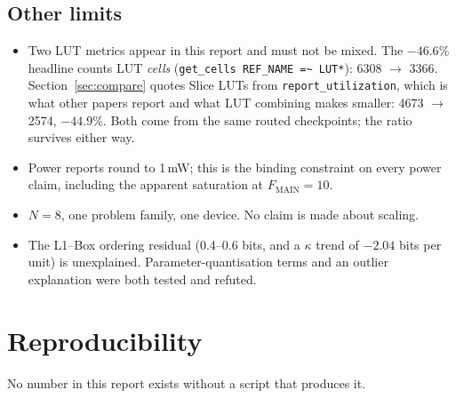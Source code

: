 \documentclass[11pt,a4paper]{article}
\begin{document}
\subsection{Other limits}
\begin{itemize}
\item Two LUT metrics appear in this report and must not be mixed. The
      $-46.6\%$ headline counts LUT \emph{cells}
      (\texttt{get\_cells REF\_NAME =\textasciitilde{} LUT*}): 6308 $\to$ 3366.
      Section~\ref{sec:compare} quotes Slice LUTs from
      \texttt{report\_utilization}, which is what other papers report and what
      LUT combining makes smaller: 4673 $\to$ 2574, $-44.9\%$. Both come from
      the same routed checkpoints; the ratio survives either way.
\item Power reports round to 1\,mW; this is the binding constraint on every
      power claim, including the apparent saturation at $F_{\text{MAIN}} = 10$.
\item $N = 8$, one problem family, one device. No claim is made about scaling.
\item The L1--Box ordering residual (0.4--0.6 bits, and a $\kappa$ trend of
      $-2.04$ bits per unit) is unexplained. Parameter-quantisation terms and an
      outlier explanation were both tested and refuted.
\end{itemize}

\section{Reproducibility}

No number in this report exists without a script that produces it.
\end{document}
